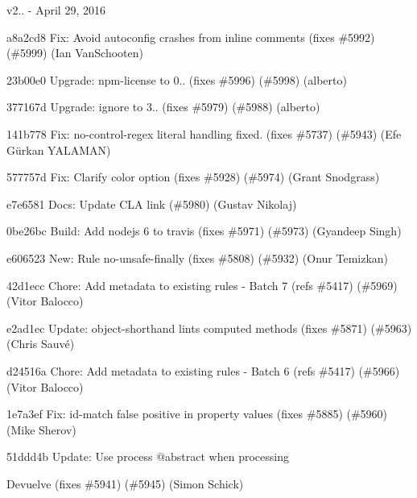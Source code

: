 v2.. -\/ April 29, 2016


\begin{DoxyItemize}
\item a8a2cd8 Fix\+: Avoid autoconfig crashes from inline comments (fixes \#5992) (\#5999) (Ian Van\+Schooten)
\item 23b00e0 Upgrade\+: npm-\/license to 0.. (fixes \#5996) (\#5998) (alberto)
\item 377167d Upgrade\+: ignore to 3.. (fixes \#5979) (\#5988) (alberto)
\item 141b778 Fix\+: no-\/control-\/regex literal handling fixed. (fixes \#5737) (\#5943) (Efe Gürkan Y\+A\+L\+A\+M\+AN)
\item 577757d Fix\+: Clarify color option (fixes \#5928) (\#5974) (Grant Snodgrass)
\item e7e6581 Docs\+: Update C\+LA link (\#5980) (Gustav Nikolaj)
\item 0be26bc Build\+: Add nodejs 6 to travis (fixes \#5971) (\#5973) (Gyandeep Singh)
\item e606523 New\+: Rule {\ttfamily no-\/unsafe-\/finally} (fixes \#5808) (\#5932) (Onur Temizkan)
\item 42d1ecc Chore\+: Add metadata to existing rules -\/ Batch 7 (refs \#5417) (\#5969) (Vitor Balocco)
\item e2ad1ec Update\+: object-\/shorthand lints computed methods (fixes \#5871) (\#5963) (Chris Sauvé)
\item d24516a Chore\+: Add metadata to existing rules -\/ Batch 6 (refs \#5417) (\#5966) (Vitor Balocco)
\item 1e7a3ef Fix\+: {\ttfamily id-\/match} false positive in property values (fixes \#5885) (\#5960) (Mike Sherov)
\item 51ddd4b Update\+: Use process @abstract when processing \begin{DoxyReturn}{Devuelve}
(fixes \#5941) (\#5945) (Simon Schick)
\end{DoxyReturn}


\end{DoxyItemize}
